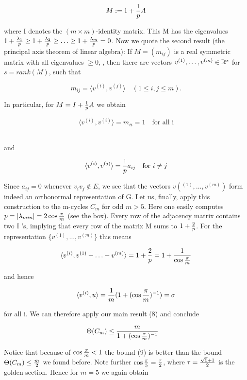 \documentclass[12pt]{memoir}
\newcommand{\setnewpagemargins}{
    \clearpage
    \checkandfixthelayout
}
\begin{document}
\[
M := 1 + {1 \over p}A  
\]

where I denotes the $(m \times m)$-identity matrix. This M has the eigenvalues
$1+{\lambda_1 \over p} \geq 1+{\lambda_2 \over p} \geq \ldots \geq 1+{\lambda_m \over p} =0$. Now we quote the second result (the
principal axis theorem of linear algebra): If $M = (m_{ij})$ is a real symmetric 
matrix with all eigenvalues $\geq 0$, , then there are vectors $v^{(1)}, \ldots, v^{(m)} \in \Bbb{R}^s$
for $s = rank(M)$, such that 

\[
m_{ij} = \langle v^{(i)}, v^{(j)} \rangle  \quad  (1 \leq i,j \leq m).
\]

In particular, for $M = I + {1 \over p}A$ we obtain

\[
\langle v^{(i)}, v^{(i)} \rangle = m_{ii} = 1  \quad \text{for all i}
\]

\\and

\[
\langle v^{(i)}, v^{(j)} \rangle = {1 \over p}a_{ij} \quad \text{for $i \neq j$}
\]

Since $a_{ij} = 0 $ whenever $ v_i v_j \notin E$, we see that the vectors $v(^{(1)},\ldots,v^{(m)})$
form indeed an orthonormal representation of G. 
Let us, finally, apply this construction to the m-cycles $C_m$ for odd $m > 5$. 
Here one easily computes $p = |\lambda_{min}| = 2\cos{\pi \over m}$ (see the box). Every 
row of the adjacency matrix contains two I 's, implying that every row of 
the matrix M sums to $1 + {2 \over p}$. For the representation $\{ v^{(1)}, \ldots, v^{(m)}\}$ this
means

\[ 
\langle v^{(i)},v^{(1)}+ \ldots + v^{(m)} \rangle=1+{2 \over p}=1+{1 \over {\cos{\pi \over m}}}
\]

and hence 

\[
\langle v^{(i)},u \rangle = {1 \over m}(1+(\cos{\pi \over m})^{-1})=\sigma
\]

for all i. We can therefore apply our main result (8) and conclude

\begin{equation}
\Theta(C_m) \leq {m \over {1+(\cos{\pi \over m})^{-1}}} \quad \label{nine}    
\end{equation}


\setnewpagemargins

Notice that because of $\cos{\pi \over m} < 1$ the bound (9) is better than the bound 
$\Theta(C_m) \leq {m \over 2}$ we found before. Note further $\cos{\pi \over 5} = {\tau \over 2}$, where $\tau = {{\sqrt{5}+1} \over 2}$
is the golden section. Hence for $m = 5$ we again obtain
\end{document}
